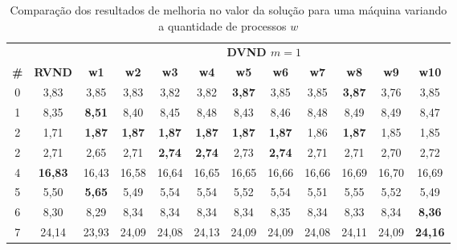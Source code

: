 \begin{table}[htbp]
\caption{Comparação dos resultados de melhoria no valor da solução para uma máquina variando a quantidade de processos $w$}
\begin{center}
\begin{tabular}{cccccccccccc}
\hline
\hline
\multicolumn{2}{c}{} &\multicolumn{10}{c}{\textbf{DVND $m=1$}} \\
\cline{3-12}
\textbf{\#} & \textbf{RVND}& \textbf{w1}& \textbf{w2}& \textbf{w3}& \textbf{w4}& \textbf{w5}& \textbf{w6}& \textbf{w7}& \textbf{w8}& \textbf{w9}& \textbf{w10} \\
\hline
0 & 3,83& 3,85& 3,83& 3,82& 3,82& \textbf{3,87}& 3,85& 3,85& \textbf{3,87}& 3,76& 3,85 \\
1 & 8,35& \textbf{8,51}& 8,40& 8,45& 8,48& 8,43& 8,46& 8,48& 8,49& 8,49& 8,47 \\
2 & 1,71& \textbf{1,87}& \textbf{1,87}& \textbf{1,87}& \textbf{1,87}& \textbf{1,87}& \textbf{1,87}& 1,86& \textbf{1,87}& 1,85& 1,85 \\
2 & 2,71& 2,65& 2,71& \textbf{2,74}& \textbf{2,74}& 2,73& \textbf{2,74}& 2,71& 2,71& 2,70& 2,72 \\
4 &\textbf{16,83}&16,43&16,58&16,64&16,65&16,65&16,66&16,66&16,69&16,70&16,69 \\
5 & 5,50& \textbf{5,65}& 5,49& 5,54& 5,54& 5,52& 5,54& 5,51& 5,55& 5,52& 5,49 \\
6 & 8,30& 8,29& 8,34& 8,34& 8,34& 8,34& 8,35& 8,34& 8,33& 8,34& \textbf{8,36} \\
7 &24,14&23,93&24,09&24,08&24,13&24,09&24,09&24,08&24,11&24,09& \textbf{24,16} \\
\hline
\end{tabular}
\label{tab:rvndDvndN1imp}
\end{center}
\end{table}


